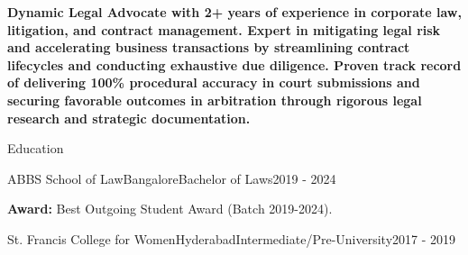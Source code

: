 \documentclass{resume} %
\begin{document}
\textbf{Dynamic Legal Advocate with 2+ years of experience in corporate law, litigation, and contract management. Expert in mitigating legal risk and accelerating business transactions by streamlining contract lifecycles and conducting exhaustive due diligence. Proven track record of delivering 100\% procedural accuracy in court submissions and securing favorable outcomes in arbitration through rigorous legal research and strategic documentation.}


\begin{rSection}{Education \vspace{.2em}}
\begin{rSubsection}{ABBS School of Law}{Bangalore}{Bachelor of Laws}{2019 - 2024}
\item \textbf{Award:} Best Outgoing Student Award (Batch 2019-2024).
\end{rSubsection}

\begin{rSubsection}{St. Francis College for Women}{Hyderabad}{Intermediate/Pre-University}{2017 - 2019}
\end{rSubsection}
\vspace{0.2 em}
\end{rSection}

\end{document}
